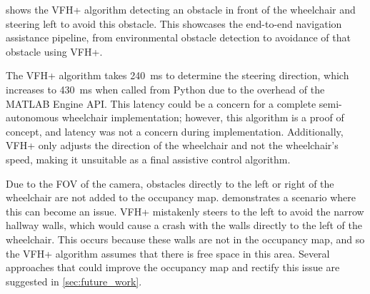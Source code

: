  shows the VFH+ algorithm detecting an obstacle in front of
the wheelchair and steering left to avoid this obstacle. This
showcases the end-to-end navigation assistance pipeline,
from environmental obstacle detection to
avoidance of that obstacle using VFH+.

The VFH+ algorithm takes
\SI{240}{\milli\second} to determine the steering direction, which increases to
\SI{430}{\milli\second} when called from Python due to the overhead of the MATLAB Engine API.
This latency could be a concern for a complete semi-autonomous wheelchair implementation;
however, this algorithm is a proof of concept, and latency was not a concern during implementation.
Additionally, VFH+ only adjusts the direction of the wheelchair and not the wheelchair's speed,
making it unsuitable as a final assistive control algorithm.

Due to the FOV of the camera, obstacles directly to the left or right of the wheelchair are not added
to the occupancy map.  demonstrates a scenario where this can
become an issue. VFH+ mistakenly steers to the left to avoid the narrow hallway walls,
which would cause a crash with the walls directly to the left of the wheelchair.
This occurs because these walls are not in the occupancy map, and so the VFH+ algorithm
assumes that there is free space in this area.
Several approaches that could improve the occupancy map and rectify this issue
are suggested in \cref{sec:future_work}.

